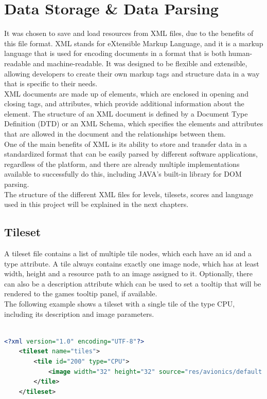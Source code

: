 \section{Data Storage \& Data Parsing}\label{sec:data-storage-&-data-parsing}
It was chosen to save and load resources from XML files, due to the benefits of this file format.
XML stands for eXtensible Markup Language, and it is a markup language that is used for encoding documents in a format that is both human-readable and machine-readable.
It was designed to be flexible and extensible, allowing developers to create their own markup tags and structure data in a way that is specific to their needs.
\\
XML documents are made up of elements, which are enclosed in opening and closing tags, and attributes, which provide additional information about the element.
The structure of an XML document is defined by a Document Type Definition (DTD) or an XML Schema, which specifies the elements and attributes that are allowed in the document and the relationships between them.
\\
One of the main benefits of XML is its ability to store and transfer data in a standardized format that can be easily parsed by different software applications, regardless of the platform, and there are
already multiple implementations available to successfully do this, including JAVA's built-in library for DOM parsing.
\\
The structure of the different XML files for levels, tilesets, scores and language used in this project will be explained in the next chapters.
\subsection{Tileset}\label{subsec:tileset}
A tileset file contains a list of multiple tile nodes, which each have an id and a type attribute.
A tile always contains exactly one image node, which has at least width, height and a resource path to an image assigned to it.
Optionally, there can also be a description attribute which can be used to set a tooltip that will be rendered to the games tooltip panel, if available.
\\
The following example shows a tileset with a single tile of the type CPU, including its description and image parameters.
\\ \\
\begin{lstlisting}[language=XML,label={lst:tileset-xml}]
    <?xml version="1.0" encoding="UTF-8"?>
    <tileset name="tiles">
        <tile id="200" type="CPU">
            <image width="32" height="32" source="res/avionics/default.png" description="Default CPU Component"/>
        </tile>
    </tileset>
\end{lstlisting}
